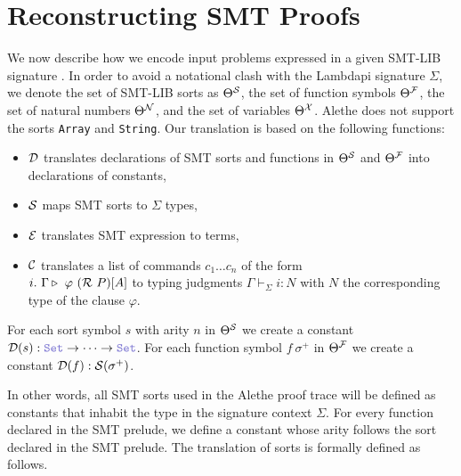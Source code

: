 \chapter{Reconstructing SMT Proofs}\label{ch:reconstruction}

We now describe how we encode input problems expressed in a given
SMT-LIB signature \cite[\S 5.2.1]{smtlib}. In order to avoid a notational clash with the Lambdapi signature $\Sigma$, we denote the set of SMT-LIB sorts as $\Theta^\cal{S}$, the set of function symbols $\Theta^\cal{F}$, the set of natural numbers $\Theta^\cal{N}$, and the set of variables $\Theta^\cal{X}$.
Alethe does not support the sorts \texttt{Array} and \texttt{String}. Our translation is based on the following functions:
\begin{itemize}
\item $\cal{D}$ translates declarations of SMT sorts and functions in $\Theta^\cal{S}$ and $\Theta^\cal{F}$ into declarations of constants,
\item $\cal{S}$ maps SMT sorts to $\Sigma$ types,
\item $\cal{E}$ translates SMT expression to {\lpm} terms,
\item $\cal{C}$ translates a list of commands  $c_1 \dots c_n$ of the form\\
  $i.~\Gamma \triangleright~\varphi~(\cal{R}~P)[A]$ to typing judgments $\Gamma \vdash_\Sigma i : N$ with $N$ the corresponding type of the clause $\varphi$.
\end{itemize}

\smallskip

\begin{definition}
For each sort symbol $s$ with arity $n$ in $\Theta^\cal{S}$ we create a constant $\cal{D}(s) : \set \ra \dots \ra \set$.
For each function symbol $f~\sigma^+$ in $\Theta^\cal{F}$ we create a constant $\cal{D}(f) : \cal{S}(\sigma^+)$.
\label{def:function-d}
\end{definition}

\smallskip

In other words, all SMT sorts used in the Alethe proof trace will be defined as constants that inhabit the type \set{} in the signature context $\Sigma$.
For every function declared in the SMT prelude, we define a constant whose arity follows the sort declared in the SMT prelude. The translation of sorts is formally defined as follows.

